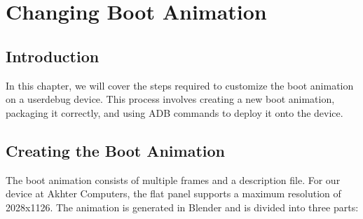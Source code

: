   {\color{teal!90}\chapter{Changing Boot Animation}\label{cap:changing-boot-animation}}


  \minitoc%

  \section{Introduction}

  In this chapter, we will cover the steps required to customize the boot animation on a \gls{userdebug} device. This process involves creating a new boot animation, packaging it correctly, and using ADB commands to deploy it onto the device.

  \section{Creating the Boot Animation}

  The boot animation consists of multiple frames and a description file. For our device at Akhter Computers, the flat panel supports a maximum resolution of 2028x1126. The animation is generated in Blender and is divided into three parts:

